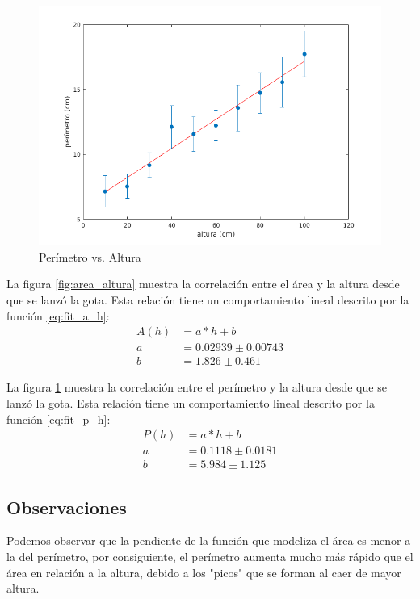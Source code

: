 \begin{figure}[H] \centering
\includegraphics[width=0.9\linewidth]{src/perimeter_vs_height.png}
\caption{Perímetro vs. Altura} \label{fig:perimetro_altura} \end{figure}

La figura \ref{fig:area_altura} muestra la correlación entre el área y la
altura desde que se lanzó la gota. Esta relación tiene un comportamiento lineal
descrito por la función \ref{eq:fit_a_h}: \begin{align}\label{eq:fit_a_h} A(h)
    &= a*h + b \\ a &= 0.02939 \pm 0.00743 \nonumber \\ b &= 1.826 \pm 0.461
\nonumber \end{align}

La figura \ref{fig:perimetro_altura} muestra la correlación entre el perímetro
y la altura desde que se lanzó la gota. Esta relación tiene un comportamiento
lineal descrito por la función \ref{eq:fit_p_h}:
\begin{align}\label{eq:fit_p_h} P(h) &= a*h + b \\ a &= 0.1118 \pm 0.0181
\nonumber \\ b &= 5.984 \pm 1.125 \nonumber \end{align}

\subsection{Observaciones}

Podemos observar que la pendiente de la función que modeliza el área es menor a
la del perímetro, por consiguiente, el perímetro aumenta mucho más rápido que
el área en relación a la altura, debido a los "picos" que se forman al caer de
mayor altura. 



